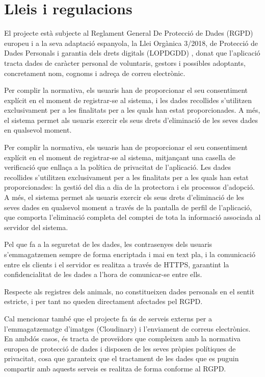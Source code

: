 \documentclass[11pt,a4paper]{report}
\begin{document}
\section{Lleis i regulacions}
El projecte està subjecte al Reglament General De Protecció de Dades (RGPD) europeu i a la seva adaptació espanyola, la Llei Orgànica 3/2018, de Protecció de Dades Personals i garantia dels drets digitals (LOPDGDD) \cite{noauthor_normativa_nodate}, donat que l'aplicació tracta dades de caràcter personal de voluntaris, gestors i possibles adoptants, concretament nom, cognoms i adreça de correu electrònic.

Per complir la normativa, els usuaris han de proporcionar el seu consentiment explícit en el moment de registrar-se al sistema, i les dades recollides s'utilitzen exclusivament per a les finalitats per a les quals han estat proporcionades. A més, el sistema permet als usuaris exercir els seus drets d'eliminació de les seves dades en qualsevol moment.

Per complir la normativa, els usuaris han de proporcionar el seu consentiment explícit en el moment de registrar-se al sistema, mitjançant una casella de verificació que enllaça a la política de privacitat de l'aplicació. Les dades recollides s'utilitzen exclusivament per a les finalitats per a les quals han estat proporcionades: la gestió del dia a dia de la protectora i els processos d'adopció. A més, el sistema permet als usuaris exercir els seus drets d'eliminació de les seves dades en qualsevol moment a través de la pantalla de perfil de l'aplicació, que comporta l'eliminació completa del comptei de tota la informació associada al servidor del sistema.

Pel que fa a la seguretat de les dades, les contrasenyes dels usuaris s'emmagatzemen sempre de forma encriptada i mai en text pla, i la comunicació entre els clients i el servidor es realitza a través de HTTPS, garantint la confidencialitat de les dades a l'hora de comunicar-se entre ells.

Respecte als registres dels animals, no constitueixen dades personals en el sentit estricte, i per tant no queden directament afectades pel RGPD.

Cal mencionar també que el projecte fa ús de serveis externs per a l'emmagatzematge d'imatges (Cloudinary) i l'enviament de correus electrònics. En ambdós casos, és tracta de proveïdors que compleixen amb la normativa europea de protecció de dades i disposen de les seves pròpies polítiques de privacitat, cosa que garanteix que el tractament de les dades que es puguin compartir amb aquests serveis es realitza de forma conforme al RGPD.
\end{document}

